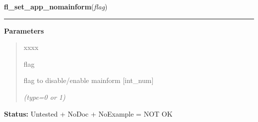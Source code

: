     \label{xformslib:library:fl_set_app_nomainform}

    \vspace{0.5ex}

\hspace{.8\funcindent}\begin{boxedminipage}{\funcwidth}

    \raggedright \textbf{fl\_set\_app\_nomainform}(\textit{flag})

    \vspace{-1.5ex}

    \rule{\textwidth}{0.5\fboxrule}
\setlength{\parskip}{2ex}
\setlength{\parskip}{1ex}
      \textbf{Parameters}
      \vspace{-1ex}

      \begin{quote}
        \begin{Ventry}{xxxx}

          \item[flag]

          flag to disable/enable mainform [int\_num]

            {\it (type=0 or 1)}

        \end{Ventry}

      \end{quote}

\textbf{Status:} Untested + NoDoc + NoExample = NOT OK



    \end{boxedminipage}

    \label{xformslib:library:fl_set_form_callback}

    \vspace{0.5ex}

